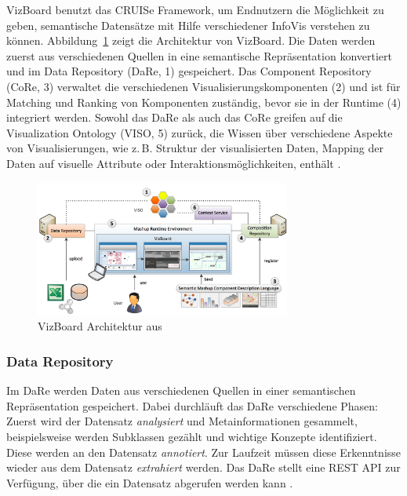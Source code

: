 \documentclass[
	headsepline,
	footsepline,
	fontsize=12pt,
	bibliography=totoc
]{scrbook}
\begin{document}
VizBoard \cite{Voigt2013} benutzt das CRUISe Framework, um Endnutzern die Möglichkeit zu geben, semantische Datensätze mit Hilfe verschiedener InfoVis verstehen zu können. Abbildung~\ref{figure:vizboard_architektur} zeigt die Architektur von VizBoard. Die Daten werden zuerst aus verschiedenen Quellen in eine semantische Repräsentation konvertiert und im Data Repository (DaRe, 1) gespeichert. Das Component Repository (CoRe, 3) verwaltet die verschiedenen Visualisierungskomponenten (2) und ist für Matching und Ranking von Komponenten zuständig, bevor sie in der Runtime (4) integriert werden. Sowohl das DaRe als auch das CoRe greifen auf die Visualization Ontology (VISO, 5) zurück, die Wissen über verschiedene Aspekte von Visualisierungen, wie z.\,B. Struktur der visualisierten Daten, Mapping der Daten auf visuelle Attribute oder Interaktionsmöglichkeiten, enthält \cite{Polowinski2013}.

\begin{figure}[htbp]
	\centering
	\includegraphics[width=0.75\textwidth]{images/grundlagen-vizboard_architektur.png}
	\caption{VizBoard Architektur aus \cite{Voigt2013}}
	\label{figure:vizboard_architektur}
\end{figure}

\subsubsection{Data Repository}
\label{section:standderforschung_data_repository}

Im DaRe werden Daten aus verschiedenen Quellen in einer semantischen Repräsentation gespeichert. Dabei durchläuft das DaRe verschiedene Phasen: Zuerst wird der Datensatz \emph{analysiert} und Metainformationen gesammelt, beispielsweise werden Subklassen gezählt und wichtige Konzepte identifiziert. Diese werden an den Datensatz \emph{annotiert}. Zur Laufzeit müssen diese Erkenntnisse wieder aus dem Datensatz \emph{extrahiert} werden. Das DaRe stellt eine REST API zur Verfügung, über die ein Datensatz abgerufen werden kann \cite{Piccolotto2012}.
\end{document}
